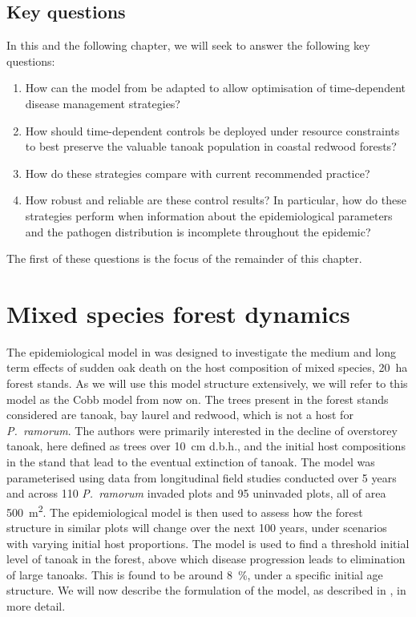 \subsection{Key questions}

In this and the following chapter, we will seek to answer the following key questions:
\begin{enumerate}
    \item How can the model from \citet{cobb_ecosystem_2012} be adapted to allow optimisation of time-dependent disease management strategies?
    \item How should time-dependent controls be deployed under resource constraints to best preserve the valuable tanoak population in coastal redwood forests?
    \item How do these strategies compare with current recommended practice?
    \item How robust and reliable are these control results? In particular, how do these strategies perform when information about the epidemiological parameters and the pathogen distribution is incomplete throughout the epidemic?
\end{enumerate}
The first of these questions is the focus of the remainder of this chapter.

\newpage
{}\label{sec:ch5:CobbModel}
\section{Mixed species forest dynamics}

The epidemiological model in \citet{cobb_ecosystem_2012} was designed to investigate the medium and long term effects of sudden oak death on the host composition of mixed species, \SI{20}{\hectare} forest stands. As we will use this model structure extensively, we will refer to this model as the Cobb model from now on. The trees present in the forest stands considered are tanoak, bay laurel and redwood, which is not a host for \textit{P.~ramorum}. The authors were primarily interested in the decline of overstorey tanoak, here defined as trees over \SI{10}{\cm} d.b.h., and the initial host compositions in the stand that lead to the eventual extinction of tanoak. The model was parameterised using data from longitudinal field studies conducted over 5 years and across 110 \textit{P.~ramorum} invaded plots and 95 uninvaded plots, all of area \SI{500}{\metre\squared}. The epidemiological model is then used to assess how the forest structure in similar plots will change over the next 100 years, under scenarios with varying initial host proportions. The model is used to find a threshold initial level of tanoak in the forest, above which disease progression leads to elimination of large tanoaks. This is found to be around \SI{8}{\percent}, under a specific initial age structure. We will now describe the formulation of the model, as described in \citet{cobb_ecosystem_2012}, in more detail.

